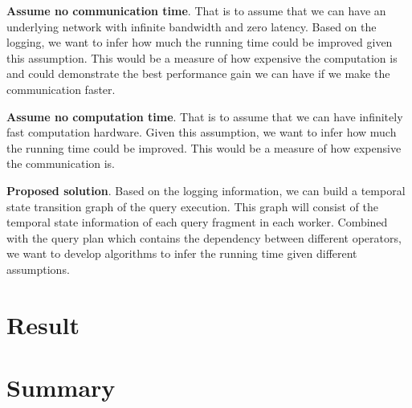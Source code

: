 \documentclass[11pt]{scrartcl}
\begin{document}
\noindent\textbf{Assume no communication time}.  That is to assume that we can have an underlying network with infinite bandwidth and zero latency. Based on the logging, we want to infer how much the running time could be improved given this assumption. This would be a measure of how expensive the computation is and could demonstrate the best performance gain we can have if we make the communication faster.

\noindent\textbf{Assume no computation time}.  That is to assume that we can have infinitely fast computation hardware. Given this assumption, we want to infer how much the running time could be improved. This would be a measure of how expensive the communication is.

\noindent\textbf{Proposed solution}.  Based on the logging information, we can build a temporal state transition graph of the query execution. This graph will consist of the temporal state information of each query fragment in each worker. Combined with the query plan which contains the dependency between different operators, we want to develop algorithms to infer the running time given different assumptions.

\section{Result}

\section{Summary}


\label{sec:outlook}




\end{document}
